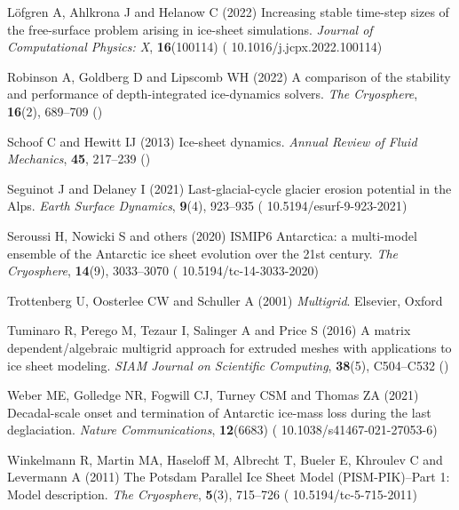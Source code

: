 \documentclass[review]{igs}
\begin{document}
\begin{thebibliography}{34}
L{\"o}fgren A, Ahlkrona J and Helanow C (2022) Increasing stable time-step
  sizes of the free-surface problem arising in ice-sheet simulations.
  \emph{Journal of Computational Physics: X}, \textbf{16}(100114) (\doi
  {10.1016/j.jcpx.2022.100114})

Robinson A, Goldberg D and Lipscomb WH (2022) A comparison of the stability and
  performance of depth-integrated ice-dynamics solvers. \emph{The Cryosphere},
  \textbf{16}(2), 689--709 ()

Schoof C and Hewitt IJ (2013) Ice-sheet dynamics. \emph{Annual Review of Fluid
  Mechanics}, \textbf{45}, 217--239 ()

Seguinot J and Delaney I (2021) Last-glacial-cycle glacier erosion potential in
  the {A}lps. \emph{Earth Surface Dynamics}, \textbf{9}(4), 923--935 (\doi
  {10.5194/esurf-9-923-2021})

Seroussi H, Nowicki S and others (2020) {ISMIP6 Antarctica}: a multi-model
  ensemble of the {A}ntarctic ice sheet evolution over the 21st century.
  \emph{The Cryosphere}, \textbf{14}(9), 3033--3070 (\doi
  {10.5194/tc-14-3033-2020})

Trottenberg U, Oosterlee CW and Schuller A (2001) \emph{Multigrid}. Elsevier,
  Oxford

Tuminaro R, Perego M, Tezaur I, Salinger A and Price S (2016) A matrix
  dependent/algebraic multigrid approach for extruded meshes with applications
  to ice sheet modeling. \emph{SIAM Journal on Scientific Computing},
  \textbf{38}(5), C504--C532 ()

Weber ME, Golledge NR, Fogwill CJ, Turney CSM and Thomas ZA (2021)
  Decadal-scale onset and termination of {A}ntarctic ice-mass loss during the
  last deglaciation. \emph{Nature Communications}, \textbf{12}(6683) (\doi
  {10.1038/s41467-021-27053-6})

Winkelmann R, Martin MA, Haseloff M, Albrecht T, Bueler E, Khroulev C and
  Levermann A (2011) {The Potsdam Parallel Ice Sheet Model (PISM-PIK)--Part 1:
  Model description}. \emph{The Cryosphere}, \textbf{5}(3), 715--726 (\doi
  {10.5194/tc-5-715-2011})


\end{thebibliography}
\end{document}
